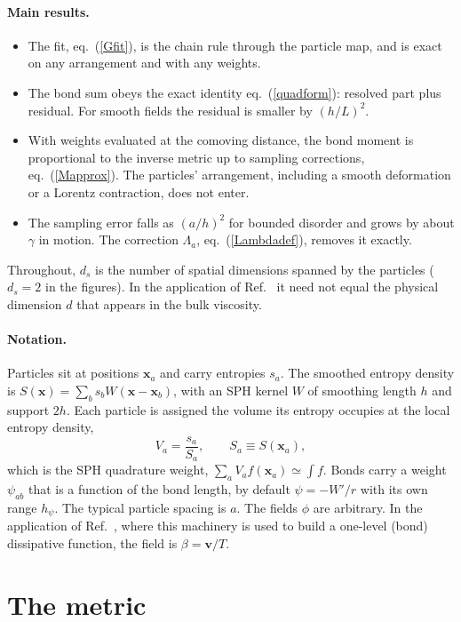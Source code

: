 \documentclass[11pt,aps,preprint,nofootinbib,superscriptaddress,tightenlines]{revtex4-2}
\def\st{\begin{equation}}
\def\stp{\end{equation}}
\def\Eq#1{eq.~(\ref{#1})}
\let\oldparagraph\paragraph
\renewcommand{\paragraph}{\par\medskip\oldparagraph}
\begin{document}
\paragraph{Main results.}
\begin{itemize}
\item The fit, \Eq{Gfit}, is the chain rule through the particle map, and is
  exact on any arrangement and with any weights.
\item The bond sum obeys the exact identity \Eq{quadform}: resolved part plus
  residual.  For smooth fields the residual is smaller by $(h/L)^2$.
\item With weights evaluated at the comoving distance, the bond moment is
  proportional to the inverse metric up to sampling corrections,
  \Eq{Mapprox}.  The particles' arrangement, including a smooth deformation or
  a Lorentz contraction, does not enter.
\item The sampling error falls as $(a/h)^2$ for bounded disorder and grows by
  about $\gamma$ in motion.  The correction $\Lambda_a$, \Eq{Lambdadef}, removes it
  exactly.
\end{itemize}
Throughout, $d_s$ is the number of spatial dimensions spanned by the particles
($d_s=2$ in the figures).  In the application of Ref.~\cite{OneLevel} it need
not equal the physical dimension $d$ that appears in the bulk viscosity.

\paragraph{Notation.}  Particles sit at positions $\bm x_a$ and carry entropies
$s_a$.  The smoothed entropy density is $S(\bm x)=\sum_bs_bW(\bm x-\bm x_b)$, with an
SPH kernel $W$ of smoothing length $h$ and support $2h$.  Each particle is
assigned the volume its entropy occupies at the local entropy density,
\st
V_a=\frac{s_a}{S_a},\qquad S_a\equiv S(\bm x_a),
\label{Va}
\stp
which is the SPH quadrature weight, $\sum_aV_af(\bm x_a)\simeq\int f$.  Bonds
carry a weight $\psi_{ab}$ that is a function of the bond length, by default
$\psi=-W'/r$ with its own range $h_\psi$.  The typical particle spacing is $a$.
The fields $\phi$ are arbitrary.  In the application of Ref.~\cite{OneLevel},
where this machinery is used to build a one-level (bond) dissipative function,
the field is $\beta=\bm v/T$.

\section{The metric}
\label{sec:metric}
\end{document}
